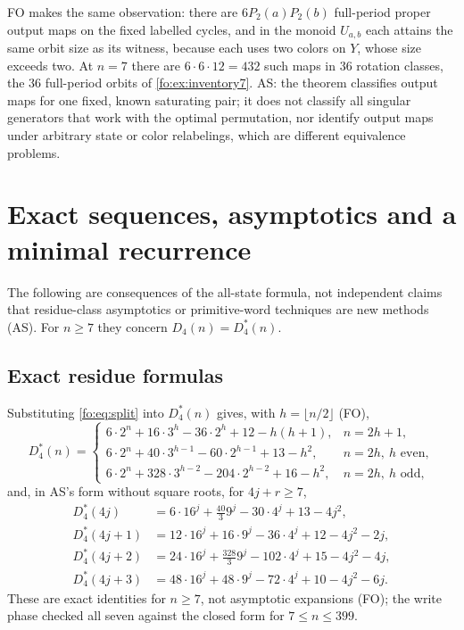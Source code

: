 \documentclass[11pt,a4paper]{article}
\numberwithin{equation}{section}
\theoremstyle{definition}
\theoremstyle{remark}
\begin{document}
FO makes the same observation: there are $6P_2(a)P_2(b)$ full-period proper
output maps on the fixed labelled cycles, and in the monoid $U_{a,b}$ each
attains the same orbit size as its witness, because each uses two colors on
$Y$, whose size exceeds two. At $n=7$ there are $6\cdot6\cdot12=432$ such maps
in $36$ rotation classes, the $36$ full-period orbits of
\cref{fo:ex:inventory7}. AS: the theorem classifies output maps for one fixed,
known saturating pair; it does not classify all singular generators that work
with the optimal permutation, nor identify output maps under arbitrary state
or color relabelings, which are different equivalence problems.

\section{Exact sequences, asymptotics and a minimal recurrence}\label{fo:sec:recurrence}

The following are consequences of the all-state formula, not independent
claims that residue-class asymptotics or primitive-word techniques are new
methods (AS). For $n\ge7$ they concern $D_4(n)=D^*_4(n)$.

\subsection{Exact residue formulas}

Substituting \eqref{fo:eq:split} into $D^*_4(n)$ gives, with
$h=\lfloor n/2\rfloor$ (FO),
\begin{equation}\label{fo:fo:eq:residue}
 D^*_4(n)=
 \begin{cases}
 6\cdot2^n+16\cdot3^h-36\cdot2^h+12-h(h+1),&n=2h+1,\\
 6\cdot2^n+40\cdot3^{h-1}-60\cdot2^{h-1}+13-h^2,&n=2h,\ h\text{ even},\\
 6\cdot2^n+328\cdot3^{h-2}-204\cdot2^{h-2}+16-h^2,&n=2h,\ h\text{ odd},
 \end{cases}
\end{equation}
and, in AS's form without square roots, for $4j+r\ge7$,
\begin{align}
 D^*_4(4j)&=6\cdot16^j+\tfrac{40}{3}9^j-30\cdot4^j+13-4j^2,\label{fo:as:eq:res0}\\
 D^*_4(4j+1)&=12\cdot16^j+16\cdot9^j-36\cdot4^j+12-4j^2-2j,\label{fo:as:eq:res1}\\
 D^*_4(4j+2)&=24\cdot16^j+\tfrac{328}{3}9^j-102\cdot4^j+15-4j^2-4j,\label{fo:as:eq:res2}\\
 D^*_4(4j+3)&=48\cdot16^j+48\cdot9^j-72\cdot4^j+10-4j^2-6j.\label{fo:as:eq:res3}
\end{align}
These are exact identities for $n\ge7$, not asymptotic expansions (FO); the
write phase checked all seven against the closed form for $7\le n\le399$.
\end{document}

